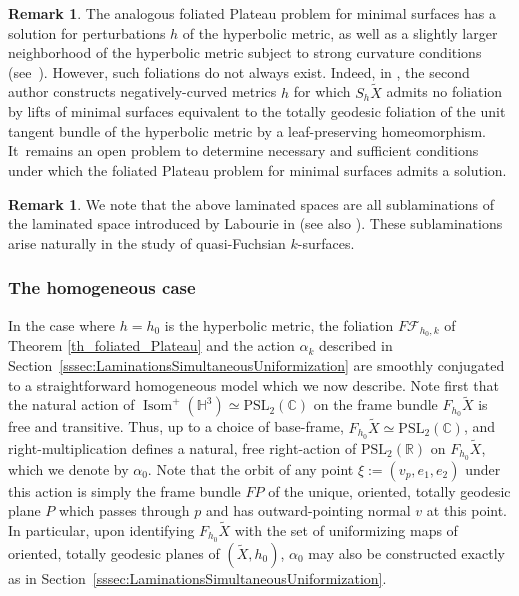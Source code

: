 \documentclass[JEP,XML,SOM,Unicode,NoEqCountersInSection,published]{cedram}
\newcommand{\ksurfaces}{$k$\nobreakdash-surfaces\xspace}
\theoremstyle{plain}
\theoremstyle{definition}
\newtheorem{remark}[theorem]{Remark}
\newcommand\PSL{\mathrm{PSL}_2(\mathbb{R})}
\newcommand\PSLc{\mathrm{PSL}_2(\mathbb{C})}
\newcommand\Hyp{\mathbb{H}^3}
\newcommand{\cF}{{\mathcal F}}
\DeclareMathOperator{\Isom}{Isom}
\begin{document}
\begin{remark}
The analogous foliated Plateau problem for minimal surfaces has a solution for perturbations $h$ of the hyperbolic metric, as well as a slightly larger neighborhood of the hyperbolic metric subject to strong curvature conditions (see~\hbox{\cite{Gromov_FolPlateau1,LoweGAFA}}). However, such foliations do not always exist. Indeed, in \cite{LoweGAFA}, the second author constructs negatively-curved metrics $h$ for which $S_h\tilde{X}$ admits no foliation by lifts of minimal surfaces equivalent to the totally geodesic foliation of the unit tangent bundle of the hyperbolic metric by a leaf-preserving homeomorphism. It~remains an open problem to determine necessary and sufficient conditions under which the foliated Plateau problem for minimal surfaces admits a solution.
\end{remark}

\begin{remark}We note that the above laminated spaces are all sublaminations of the laminated space introduced by Labourie in \cite{LabourieGAFA,LabourieInvent,LabourieAnnals} (see also \cite{Smith_asymp}). These sublaminations arise naturally in the study of quasi-Fuchsian \ksurfaces.
\end{remark}

\subsubsection{The homogeneous case}
In the case where $h=h_0$ is the hyperbolic metric, the foliation $F\cF_{h_0,k}$ of Theorem \ref{th_foliated_Plateau} and the action $\alpha_k$ described in Section~\ref{sssec:LaminationsSimultaneousUniformization} are smoothly conjugated to a straightforward homogeneous model which we now describe. Note first that the natural action of $\Isom^+(\Hyp)\simeq\PSLc$ on the frame bundle $F_{h_0}\tilde{X}$ is free and transitive. Thus, up to a choice of base-frame, $F_{h_0}\tilde{X}\simeq\PSLc$, and right-multiplication defines a natural, free right-action of $\PSL$ on $F_{h_0}\tilde{X}$, which we denote by $\alpha_0$. Note that the orbit of any point $\xi:=(v_p,e_1,e_2)$ under this action is simply the frame bundle $FP$ of the unique, oriented, totally geodesic plane $P$ which passes through $p$ and has outward-pointing normal $v$ at this point. In particular, upon identifying $F_{h_0}\tilde{X}$ with the set of uniformizing maps of oriented, totally geodesic planes of $(\tilde{X},h_0)$, $\alpha_0$ may also be constructed exactly as in Section~\ref{sssec:LaminationsSimultaneousUniformization}.
\end{document}
